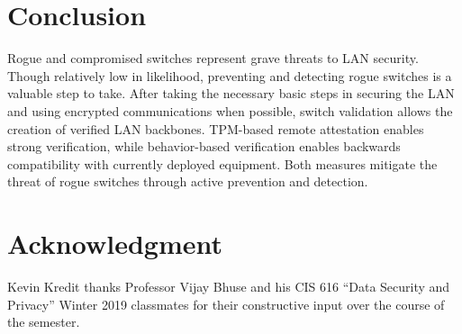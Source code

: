 \documentclass[journal]{IEEEtran}
\begin{document}
\section{Conclusion}
Rogue and compromised switches represent grave threats to LAN security. Though relatively low in
likelihood, preventing and detecting rogue switches is a valuable step to take. After taking the
necessary basic steps in securing the LAN and using encrypted communications when possible,
switch validation allows the creation of verified LAN backbones. TPM-based remote attestation
enables strong verification, while behavior-based verification enables backwards compatibility with
currently deployed equipment. Both measures mitigate the threat of rogue switches through active
prevention and detection.







\section*{Acknowledgment}
Kevin Kredit thanks Professor Vijay Bhuse and his CIS 616 ``Data Security and Privacy'' Winter 2019
classmates for their constructive input over the course of the semester.
\end{document}
